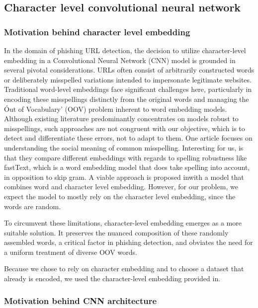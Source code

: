 \documentclass{article}
\begin{document}
    \subsection{Character level convolutional neural network}\label{subsec:character-level-convolutional-neural-network}

    \subsubsection{Motivation behind character level embedding}

    In the domain of phishing URL detection, the decision to utilize character-level embedding in a Convolutional Neural Network (CNN) model is grounded in several pivotal considerations.
    URLs often consist of arbitrarily constructed words or deliberately misspelled variations intended to impersonate legitimate websites.
    Traditional word-level embeddings face significant challenges here, particularly in encoding these misspellings distinctly from the original words and managing the \'Out of Vocabulary' (OOV) problem inherent to word embedding models.
    Although existing literature predominantly concentrates on models robust to misspellings, such approaches are not congruent with our objective, which is to detect and differentiate these errors, not to adapt to them.
    One article focuses on understanding the social meaning of common misspelling\cite{OOVmispelling}.
    Interesting for us, is that they compare different embeddings with regards to spelling robustness like fastText, which is a word embedding model that does take spelling into account, in opposition to skip gram.
    A viable approach is proposed in\cite{WordCharacterEmbeddings}with a model that combines word and character level embedding.
    However, for our problem, we expect the model to mostly rely on the character level embedding, since the words are random.

    To circumvent these limitations, character-level embedding emerges as a more suitable solution.
    It preserves the nuanced composition of these randomly assembled words, a critical factor in phishing detection, and obviates the need for a uniform treatment of diverse OOV words.

    Because we chose to rely on character embedding and to choose a dataset that already is encoded, we used the character-level embedding provided in\cite{CharacterLevelCNN}.

    \subsubsection{Motivation behind CNN architecture}
\end{document}
